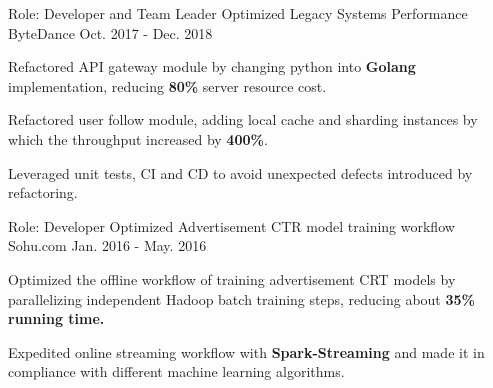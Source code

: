\begin{cventries}

  \cventrynew
    {Role: Developer and Team Leader} %
    {Optimized Legacy Systems Performance} %
    {ByteDance} %
    {Oct. 2017 - Dec. 2018} %
    {
      \begin{cvitems} 
        \item {Refactored API gateway module by changing python into \textbf{Golang} implementation, reducing \textbf{80\%} server resource cost.}
        \item {Refactored user follow module, adding local cache and sharding instances by which the throughput increased by \textbf{400\%}.}
        \item {Leveraged unit tests, CI and CD to avoid unexpected defects introduced by refactoring.}
      \end{cvitems}
    }


  \cventrynew
    {Role: Developer} %
    {Optimized Advertisement CTR model training workflow} %
    {Sohu.com} %
    {Jan. 2016 - May. 2016} %
    {
      \begin{cvitems} %
        \item {Optimized the offline workflow of training advertisement CRT models by parallelizing independent Hadoop batch training steps, reducing about \textbf{35\% running time.}}
        \item {Expedited online streaming workflow with \textbf{Spark-Streaming} and made it in compliance with different machine learning algorithms.}
      \end{cvitems}
    }


\end{cventries}
